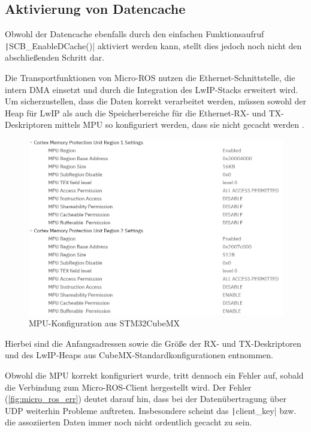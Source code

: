 \subsection{Aktivierung von Datencache}

Obwohl der Datencache ebenfalls durch den einfachen Funktionsaufruf
\texttt|SCB_EnableDCache()| aktiviert werden kann, stellt dies jedoch
noch nicht den abschließenden Schritt dar.

Die Transportfunktionen von Micro-ROS nutzen die Ethernet-Schnittstelle, die
intern DMA einsetzt und durch die Integration des LwIP-Stacks erweitert wird. Um
sicherzustellen, dass die Daten korrekt verarbeitet werden, müssen sowohl der
Heap für LwIP als auch die Speicherbereiche für die Ethernet-RX- und
TX-Deskriptoren mittels \ac{MPU} so konfiguriert werden, dass sie nicht gecacht
werden \cite{STM32H7_LwIP_Examples}.

\begin{figure}[H]
    \centering
    \includegraphics[width=1\textwidth]{assets/mpu_conf_cubemx}
    \caption{MPU-Konfiguration aus STM32CubeMX}
\end{figure}

Hierbei sind die Anfangsadressen sowie die Größe der RX- und TX-Deskriptoren
und des LwIP-Heaps aus CubeMX-Standardkonfigurationen entnommen.

Obwohl die MPU korrekt konfiguriert wurde, tritt dennoch ein Fehler auf, sobald
die Verbindung zum Micro-ROS-Client hergestellt wird. Der Fehler
(\ref{fig:micro_ros_err}) deutet darauf hin, dass bei der Datenübertragung über
UDP weiterhin Probleme auftreten. Insbesondere scheint das
\texttt|client_key| bzw. die assoziierten Daten immer noch nicht
ordentlich gecacht zu sein.

